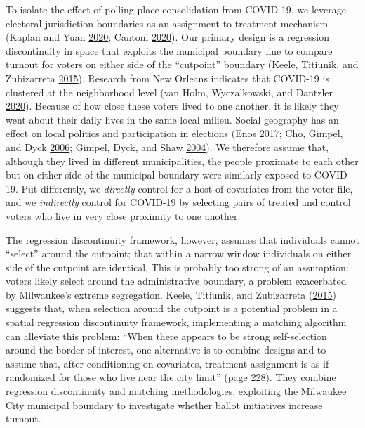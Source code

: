 \documentclass[
  12pt,
]{article}
\begin{document}
To isolate the effect of polling place consolidation from COVID-19, we leverage electoral jurisdiction boundaries as an assignment to treatment mechanism (Kaplan and Yuan \protect\hyperlink{ref-Kaplan2020}{2020}; Cantoni \protect\hyperlink{ref-Cantoni2020}{2020}). Our primary design is a regression discontinuity in space that exploits the municipal boundary line to compare turnout for voters on either side of the ``cutpoint'' boundary (Keele, Titiunik, and Zubizarreta \protect\hyperlink{ref-Keele2015}{2015}). Research from New Orleans indicates that COVID-19 is clustered at the neighborhood level (van Holm, Wyczalkowski, and Dantzler \protect\hyperlink{ref-vanHolm2020}{2020}). Because of how close these voters lived to one another, it is likely they went about their daily lives in the same local milieu. Social geography has an effect on local politics and participation in elections (Enos \protect\hyperlink{ref-Enos2017}{2017}; Cho, Gimpel, and Dyck \protect\hyperlink{ref-Cho2006}{2006}; Gimpel, Dyck, and Shaw \protect\hyperlink{ref-Gimpel2004}{2004}). We therefore assume that, although they lived in different municipalities, the people proximate to each other but on either side of the municipal boundary were similarly exposed to COVID-19. Put differently, we \emph{directly} control for a host of covariates from the voter file, and we \emph{indirectly} control for COVID-19 by selecting pairs of treated and control voters who live in very close proximity to one another.

The regression discontinuity framework, however, assumes that individuals cannot ``select'' around the cutpoint; that within a narrow window individuals on either side of the cutpoint are identical. This is probably too strong of an assumption: voters likely select around the administrative boundary, a problem exacerbated by Milwaukee's extreme segregation. Keele, Titiunik, and Zubizarreta (\protect\hyperlink{ref-Keele2015}{2015}) suggests that, when selection around the cutpoint is a potential problem in a spatial regression discontinuity framework, implementing a matching algorithm can alleviate this problem: ``When there appears to be strong self-selection around the border of interest, one alternative is to combine designs and to assume that, after conditioning on covariates, treatment assignment is as-if randomized for those who live near the city limit'' (page 228). They combine regression discontinuity and matching methodologies, exploiting the Milwaukee City municipal boundary to investigate whether ballot initiatives increase turnout.
\end{document}
